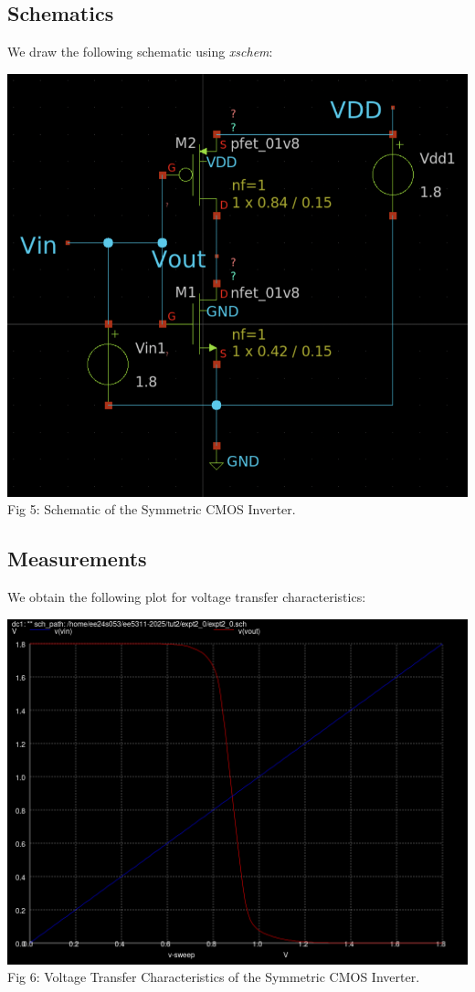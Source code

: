 \documentclass[12pt,a4paper]{article}
\begin{document}
\subsection{Schematics}
\noindent We draw the following schematic using \emph{xschem}:
\begin{center}
\includegraphics[scale=0.7]{tut2/reports/media/expt2_0.sch.png} \\ Fig 5: Schematic of the Symmetric CMOS Inverter.
\end{center}

\subsection{Measurements}
\noindent We obtain the following plot for voltage transfer characteristics:
\begin{center}
\includegraphics[scale=0.35]{tut2/reports/media/expt2_0_vtc.png} \\ Fig 6: Voltage Transfer Characteristics of the Symmetric CMOS Inverter.
\end{center}
\end{document}
